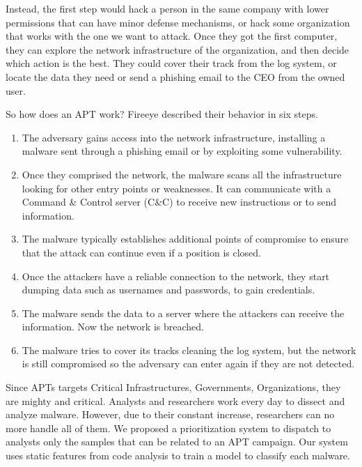 Instead, the first step would hack a person in the same company with lower permissions that can have minor defense mechanisms, or hack some organization that works with the one we want to attack. Once they got the first computer, they can explore the network infrastructure of the organization, and then decide which action is the best.
They could cover their track from the log system, or locate the data they need or send a phishing email to the CEO from the owned user.

So how does an APT work? Fireeye described their behavior in six steps. \cite{fireeye_anatomy}

\begin{enumerate}
	\item The adversary gains access into the network infrastructure, installing a malware sent through a phishing email or by exploiting some vulnerability.
	\item Once they comprised the network, the malware scans all the infrastructure looking for other entry points or weaknesses. It can communicate with a Command \& Control server (C\&C) to receive new instructions or to send information.
	\item The malware typically establishes additional points of compromise to ensure that the attack can continue even if a position is closed.
	\item Once the attackers have a reliable connection to the network, they start dumping data such as usernames and passwords, to gain credentials.
	
	\item The malware sends the data to a server where the attackers can receive the information. Now the network is breached.
	
	\item The malware tries to cover its tracks cleaning the log system, but the network is still compromised so the adversary can enter again if they are not detected.
\end{enumerate}

Since APTs targets Critical Infrastructures, Governments, Organizations, they are mighty and critical. Analysts and researchers work every day to dissect and analyze malware. However, due to their constant increase, researchers can no more handle all of them. We proposed a prioritization system to dispatch to analysts only the samples that can be related to an APT campaign. Our system uses static features from code analysis to train a model to classify each malware.

